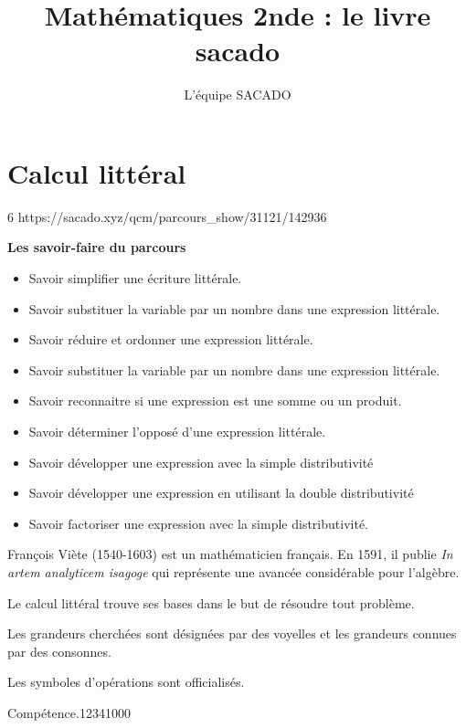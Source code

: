 



\title{Mathématiques 2nde  : le livre sacado}
\author{L'équipe SACADO}




\chapter{Calcul littéral}{6}
{https://sacado.xyz/qcm/parcours_show/31121/142936}
{
 \begin{CpsCol}
	\textbf{Les savoir-faire du parcours}
 	\begin{itemize}
 		\item Savoir simplifier une écriture littérale.
		\item Savoir substituer la variable par un nombre dans une expression littérale.
		\item Savoir réduire et ordonner une expression littérale.
		\item Savoir substituer la variable par un nombre dans une expression littérale.
		\item Savoir reconnaitre si une expression est une somme ou un produit.
		\item Savoir déterminer l'opposé d'une expression littérale.
		\item Savoir développer une expression avec la simple distributivité
		\item Savoir développer une expression en utilisant la double distributivité
		\item Savoir factoriser une expression avec la simple distributivité.
 	\end{itemize}
 \end{CpsCol}

\begin{His}
François Viète (1540-1603) est un mathématicien français. En 1591, il publie \textit{In artem analyticem isagoge} qui représente une avancée considérable pour l'algèbre.

Le calcul littéral trouve ses bases dans le but de résoudre tout problème.

Les grandeurs cherchées sont désignées par des voyelles et les grandeurs connues par des consonnes.

Les symboles d'opérations sont officialisés.
\end{His}

\begin{ExoDec}{Compétence.}{1234}{1}{0}{0}{0}
\end{ExoDec}
}

